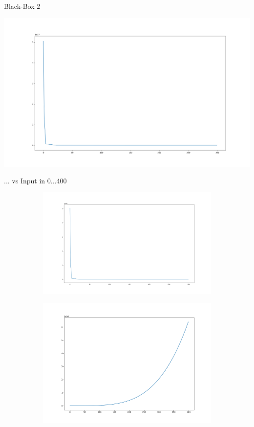 \documentclass{ocbeameruni}
\begin{document}
\begin{frame}{Black-Box 2}
    \begin{center}
    \includegraphics[scale=0.25]{plots/bb2_2.png}
    \end{center}
\end{frame}


\begin{frame}{... vs Input in 0...400}
\begin{figure}
\centering
\begin{subfigure}
  \centering
  \includegraphics[width=.5\linewidth]{plots/bb2_2.png}
\end{subfigure}
\begin{subfigure}
  \centering
  \includegraphics[width=.5\linewidth]{plots/bb2_distr.png}
\end{subfigure}
\end{figure}
\end{frame}
\end{document}
